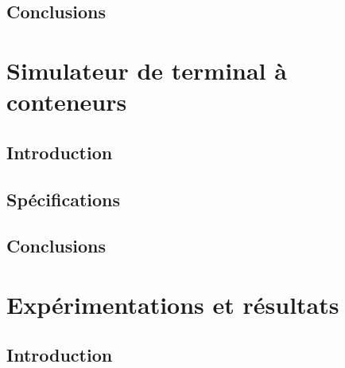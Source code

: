 \documentclass[
a4paper,
11pt,
twoside,
onecolumn,
openright,      %
leqno,          %
final   %
]{phdlasl}
\begin{document}
	\section*{Conclusions}\label{partie:ordo-conclusions}
	

	\chapter{Simulateur de terminal à conteneurs}\label{chapitre:simulation}

	\section*{Introduction}\label{partie:simulation-introduction}
	

	\section{Spécifications}\label{partie:simulation-specification}
	

	

	\section*{Conclusions}\label{partie:simulation-conclusions}
	

	\chapter{Expérimentations et résultats}\label{chapitre:resultats}

	\section*{Introduction}\label{partie:resultats-introduction}
	
\end{document}
